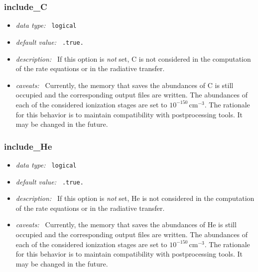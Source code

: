 \documentclass[a4paper,10pt]{article}
\begin{document}
\subsubsection{include\_C}
\label{opt:includec}
\begin{itemize}
 \item \textit{data type:~} \texttt{logical}
 \item \textit{default value:~} \texttt{.true.}
 \item \textit{description:~} If this option is 
 \textit{not} set, C is not considered 
 in the computation of the rate equations or in the
 radiative transfer. 
 \item \textit{caveats:~} Currently, the memory that saves the 
 abundances of C is still occupied and the corresponding output
 files are written. The abundances of each of the considered ionization
 stages are set to $10^{-150}\,\mathrm{cm^{-3}}$. The rationale for
 this behavior is to maintain compatibility with postprocessing
 tools. It may be changed in the future.
\end{itemize}

\subsubsection{include\_He}
\label{opt:includehe}
\begin{itemize}
 \item \textit{data type:~} \texttt{logical}
 \item \textit{default value:~} \texttt{.true.}
 \item \textit{description:~} If this option is 
 \textit{not} set, He is not considered 
 in the computation of the rate equations or in the
 radiative transfer. 
 \item \textit{caveats:~} Currently, the memory that saves the 
 abundances of He is still occupied and the corresponding output
 files are written. The abundances of each of the considered ionization
 stages are set to $10^{-150}\,\mathrm{cm^{-3}}$. The rationale for
 this behavior is to maintain compatibility with postprocessing
 tools. It may be changed in the future.
\end{itemize}
\end{document}
